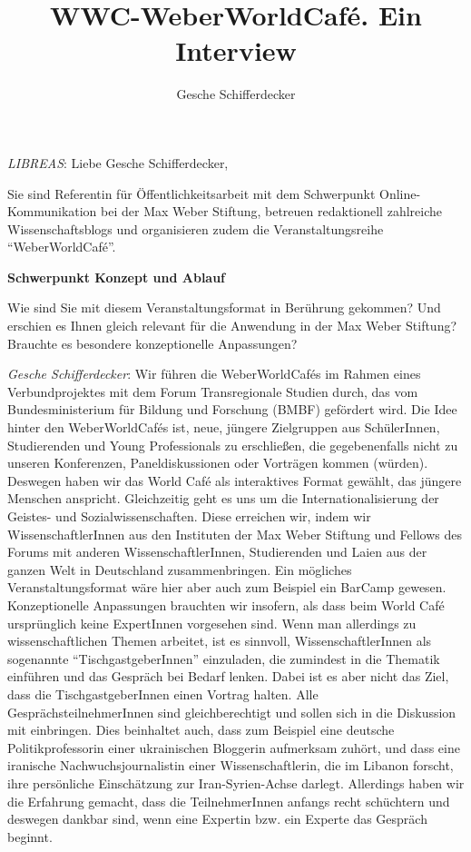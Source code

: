 \documentclass[a4paper,
fontsize=11pt,
oneside,
numbers=noperiodatend,
parskip=half-,
bibliography=totoc,
final
]{scrartcl}
\title{\LARGE{WWC-WeberWorldCafé. Ein Interview}} %
\author{Gesche Schifferdecker} %
\date{}
\begin{document}
\maketitle
\thispagestyle{fancyplain} 


\emph{LIBREAS}: Liebe Gesche Schifferdecker,

Sie sind Referentin für Öffentlichkeitsarbeit mit dem Schwerpunkt
Online-Kommunikation bei der Max Weber Stiftung, betreuen redaktionell
zahlreiche Wissenschaftsblogs und organisieren zudem die
Veranstaltungsreihe \enquote{WeberWorldCafé}.

\textbf{Schwerpunkt Konzept und Ablauf}

Wie sind Sie mit diesem Veranstaltungsformat in Berührung gekommen? Und
erschien es Ihnen gleich relevant für die Anwendung in der Max Weber
Stiftung? Brauchte es besondere konzeptionelle Anpassungen?

\emph{Gesche Schifferdecker}: Wir führen die WeberWorldCafés im Rahmen
eines Verbundprojektes mit dem Forum Transregionale Studien durch, das
vom Bundesministerium für Bildung und Forschung (BMBF) gefördert wird.
Die Idee hinter den WeberWorldCafés ist, neue, jüngere Zielgruppen aus
SchülerInnen, Studierenden und Young Professionals zu erschließen, die
gegebenenfalls nicht zu unseren Konferenzen, Paneldiskussionen oder
Vorträgen kommen (würden). Deswegen haben wir das World Café als
interaktives Format gewählt, das jüngere Menschen anspricht.
Gleichzeitig geht es uns um die Internationalisierung der Geistes- und
Sozialwissenschaften. Diese erreichen wir, indem wir
WissenschaftlerInnen aus den Instituten der Max Weber Stiftung und
Fellows des Forums mit anderen WissenschaftlerInnen, Studierenden und
Laien aus der ganzen Welt in Deutschland zusammenbringen. Ein mögliches
Veranstaltungsformat wäre hier aber auch zum Beispiel ein BarCamp
gewesen. Konzeptionelle Anpassungen brauchten wir insofern, als dass
beim World Café ursprünglich keine ExpertInnen vorgesehen sind. Wenn man
allerdings zu wissenschaftlichen Themen arbeitet, ist es sinnvoll,
WissenschaftlerInnen als sogenannte \enquote{TischgastgeberInnen}
einzuladen, die zumindest in die Thematik einführen und das Gespräch bei
Bedarf lenken. Dabei ist es aber nicht das Ziel, dass die
TischgastgeberInnen einen Vortrag halten. Alle GesprächsteilnehmerInnen
sind gleichberechtigt und sollen sich in die Diskussion mit einbringen.
Dies beinhaltet auch, dass zum Beispiel eine deutsche Politikprofessorin
einer ukrainischen Bloggerin aufmerksam zuhört, und dass eine iranische
Nachwuchsjournalistin einer Wissenschaftlerin, die im Libanon forscht,
ihre persönliche Einschätzung zur Iran-Syrien-Achse darlegt. Allerdings
haben wir die Erfahrung gemacht, dass die TeilnehmerInnen anfangs recht
schüchtern und deswegen dankbar sind, wenn eine Expertin bzw. ein
Experte das Gespräch beginnt.
\end{document}
